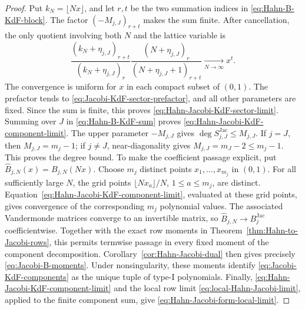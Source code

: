 \documentclass[10pt]{amsart}
\theoremstyle{plain}
\theoremstyle{definition}
\theoremstyle{remark}
\begin{document}
\begin{proof}
Put \(k_N=\lfloor Nx\rfloor\), and let \(r,t\) be the two summation indices in
\eqref{eq:Hahn-B-KdF-block}. The factor
\((-M_{j,J})_{r+t}\) makes the sum finite. After cancellation, the only
quotient involving both \(N\) and the lattice variable is
\[
 \frac{(k_N+\eta_{j,J})_{r+t}}
      {(k_N+\eta_{j,J})_r}
 \frac{(N+\eta_{j,J})_r}
      {(N+\eta_{j,J}+1)_{r+t}}
 \xrightarrow[N\to\infty]{}x^t.
\]
The convergence is uniform for \(x\) in each compact subset of \((0,1)\).
The prefactor tends to \eqref{eq:Jacobi-KdF-sector-prefactor}, and all
other parameters are fixed. Since the sum is finite, this proves
\eqref{eq:Hahn-Jacobi-KdF-sector-limit}. Summing over \(J\) in
\eqref{eq:Hahn-B-KdF-sum} proves
\eqref{eq:Hahn-Jacobi-KdF-component-limit}. The upper parameter
\(-M_{j,J}\) gives \(\deg S_{j,J}^{\mathrm{Jac}}\le M_{j,J}\).
If \(j=J\), then \(M_{j,J}=m_j-1\); if \(j\ne J\), near-diagonality gives
\(M_{j,J}=m_J-2\le m_j-1\). This proves the degree bound.
To make the coefficient passage explicit, put
\(\widehat B_{j,N}(x)=B_{j,N}(Nx)\). Choose \(m_j\) distinct points
\(x_1,\ldots,x_{m_j}\) in \((0,1)\). For all sufficiently large \(N\), the
grid points \(\lfloor Nx_a\rfloor/N\), \(1\le a\le m_j\), are distinct.
Equation~\eqref{eq:Hahn-Jacobi-KdF-component-limit}, evaluated at these
grid points, gives convergence of the corresponding \(m_j\) polynomial
values. The associated Vandermonde matrices converge to an invertible
matrix, so \(\widehat B_{j,N}\to B_j^{\mathrm{Jac}}\)
coefficientwise.
Together with the exact row moments in
Theorem~\ref{thm:Hahn-to-Jacobi-rows}, this permits termwise passage in
every fixed moment of the component decomposition.
Corollary~\ref{cor:Hahn-Jacobi-dual} then gives precisely
\eqref{eq:Jacobi-B-moments}. Under nonsingularity, these moments identify
\eqref{eq:Jacobi-KdF-components} as the unique tuple of type-I
polynomials. Finally,
\eqref{eq:Hahn-Jacobi-KdF-component-limit} and the local row limit
\eqref{eq:local-Hahn-Jacobi-limit}, applied to the finite component sum,
give \eqref{eq:Hahn-Jacobi-form-local-limit}.
\end{proof}
\end{document}
